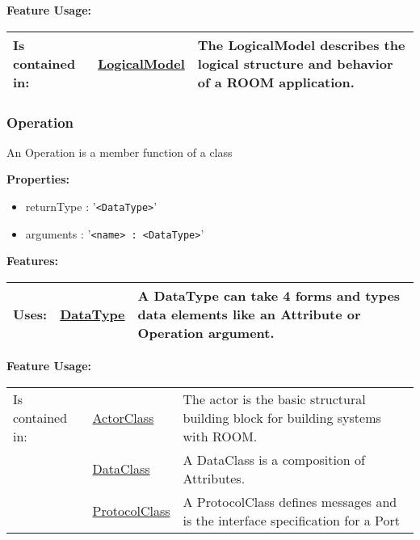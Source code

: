 		\begingroup
		\textbf{Feature Usage:}
		\renewcommand{\arraystretch}{1.8} %
		\begin{longtable}{l|l p{}}
			\hline
		Is contained in: & \tabitem \hyperlink{ref:LogicalModel}{LogicalModel}  & The LogicalModel describes the logical structure and behavior of a ROOM application.\\
		\hline
		\end{longtable}
		\endgroup
		
		
	\vspace{\baselineskip}
	\vspace{\baselineskip}
	\vspace{\baselineskip}
	
	\subsubsection{Operation}
		\hypertarget{ref:Operation}{}
		
		An Operation is a member function of a class
		
		
		\textbf{Properties:}
		\begin{itemize}
		\item returnType : '\verb|<DataType>|'
		\item arguments : '\verb|<name> : <DataType>|'
		\end{itemize}
		
		\begingroup
		\textbf{Features:}
		\renewcommand{\arraystretch}{1.8} %
		\begin{longtable}{l|l p{}}
			\hline
		Uses: & \tabitem \hyperlink{ref:DataType}{DataType}  & A DataType can take 4 forms and types data elements like an Attribute or Operation argument.\\
		\hline
		\end{longtable}
		\endgroup
		
		\begingroup
		\textbf{Feature Usage:}
		\renewcommand{\arraystretch}{1.8} %
		\begin{longtable}{l|l p{}}
			\hline
		Is contained in: & \tabitem \hyperlink{ref:ActorClass}{ActorClass}  & The actor is the basic structural building block for building systems with ROOM.\\
		& \tabitem \hyperlink{ref:DataClass}{DataClass}  & A DataClass is a composition of Attributes. \\
		& \tabitem \hyperlink{ref:ProtocolClass}{ProtocolClass}  & A ProtocolClass defines messages and is the interface specification for a Port \\
		\hline
		\end{longtable}
		\endgroup
		
